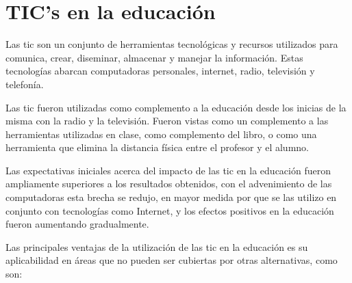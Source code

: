 \chapter{TIC's en la educación}

Las \Gls{tic} son un conjunto de herramientas tecnológicas y recursos utilizados
para comunica, crear, diseminar, almacenar y manejar la
información\cite{unesco:ict}. Estas tecnologías abarcan computadoras personales,
internet, radio, televisión y telefonía\cite{tinio:ict}.

Las \Gls{tic} fueron utilizadas como complemento a la educación desde los
inicias de la misma con la radio y la televisión. Fueron vistas como un
complemento a las herramientas utilizadas en clase, como complemento del libro,
o como una herramienta que elimina la distancia física entre el profesor y el
alumno\cite{unesco:ict}. 

Las expectativas iniciales acerca del impacto de las \Gls{tic} en la educación
fueron ampliamente superiores a los resultados obtenidos\cite{unesco:ict}, con
el advenimiento de las computadoras esta brecha se redujo, en mayor medida por
que se las utilizo en conjunto con tecnologías como Internet, y los efectos
positivos en la educación fueron aumentando gradualmente\cite{unesco:ict}.

Las principales ventajas de la utilización de las \Gls{tic} en la educación es
su aplicabilidad en áreas que no pueden ser cubiertas por otras alternativas,
como son:

